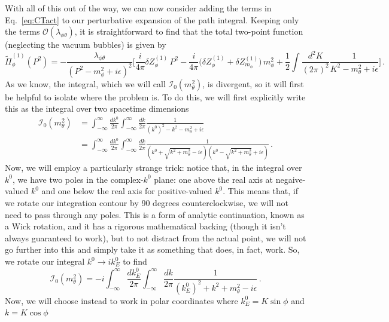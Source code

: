 \documentclass{article}
\numberwithin{equation}{subsection}
\begin{document}
With all of this out of the way, we can now consider adding the terms in Eq.~\eqref{eq:CTact} to our perturbative expansion of the path integral. Keeping only the terms 
$\mathcal{O}(\lambda_{\phi\theta})$, it is straightforward to find that the total two-point function (neglecting the vacuum bubbles) is given by
\begin{equation}
    \tilde{\Pi}^{(1)}_\phi(P^2) = -\frac{\lambda_{\phi\theta}}{(P^2 - m_\phi^2 + i\epsilon)^2}\Bigg[\frac{i}{4\pi}\delta Z_\phi^{(1)}\, P^2 
	- \frac{i}{4\pi}\Big(\delta Z_\phi^{(1)} + \delta Z_{m_\phi}^{(1)}\Big)\,m_\phi^2 + \frac{1}{2}\int\frac{d^2K}{(2\pi)^2}\frac{1}{K^2 - m_\theta^2 + i\epsilon}\Bigg]\,.
\end{equation}
As we know, the integral, which we will call $\mathcal{I}_0(m_\theta^2)$, is divergent, so it will first be helpful to isolate where the problem is. To do this, we will 
first explicitly write this as the integral over two spacetime dimensions
\begin{equation}\begin{split}
    \mathcal{I}_0(m_\theta^2) &= \int_{-\infty}^\infty\frac{dk^0}{2\pi}\int_{-\infty}^\infty\frac{dk}{2\pi}\frac{1}{(k^0)^2 - k^2 - m_\theta^2 + i\epsilon} \\[0.5em]
    &= \int_{-\infty}^\infty\frac{dk^0}{2\pi}\int_{-\infty}^\infty\frac{dk}{2\pi}\frac{1}{(k^0 + \sqrt{k^2 + m_\theta^2} - i\epsilon)(k^0 - \sqrt{k^2 + m_\theta^2}+i\epsilon)}\,.
\end{split}\end{equation}
Now, we will employ a particularly strange trick: notice that, in the integral over $k^0$, we have two poles in the complex-$k^0$ plane: one above the real axis at negaive-valued 
$k^0$ and one below the real axis for positive-valued $k^0$. This means that, if we rotate our integration contour by 90 degrees counterclockwise, we will not need to pass through any poles. 
This is a form of analytic continuation, known as a Wick rotation, and it has a rigorous mathematical backing (though it isn't always guaranteed to work), but to not distract from the actual point, we will 
not go further into this and simply take it as something that does, in fact, work. So, we rotate our integral $k^0\to ik^0_E$ to find
\begin{equation}
    \mathcal{I}_0(m_\theta^2) = -i\int_{-\infty}^\infty\frac{dk_E^0}{2\pi}\int_{-\infty}^\infty\frac{dk}{2\pi}\frac{1}{(k^0_E)^2 + k^2 + m_\theta^2 - i\epsilon}\,.
\end{equation}
Now, we will choose instead to work in polar coordinates where $k_E^0 = K\sin\phi$ and $k = K\cos\phi$
\end{document}
